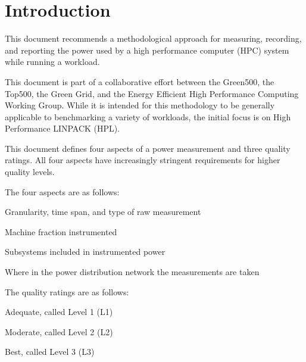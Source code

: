 \chapter{Introduction}
\label{sec:intro}

\noindent
This document recommends a methodological approach for measuring, recording, and reporting the power used by a high performance 
computer (HPC) system while
running a workload. 
\wl

\noindent
This document is part of a collaborative effort between the Green500, the Top500, 
the Green Grid, and the Energy Efficient High Performance Computing Working Group.  While 
it is intended for this methodology to be generally applicable to benchmarking a variety of 
workloads, the initial focus is on High Performance LINPACK (HPL). 
\wl

\noindent
This document defines four aspects of a power measurement and three quality ratings. All 
four aspects have increasingly stringent requirements for higher quality levels.  
\wl

\noindent
The four aspects are as follows:


\begin{packed_enum}
\item 
Granularity, time span, and type of raw measurement
\item 
Machine fraction instrumented
\item 
Subsystems included in instrumented power
\item 
Where in the power distribution network the measurements are taken
\end{packed_enum}

The quality ratings are as follows:

\begin{packed_item}
\item 
Adequate, called Level 1 (L1)
\item
Moderate, called Level 2 (L2)
\item
Best, called Level 3 (L3)
\end{packed_item}

